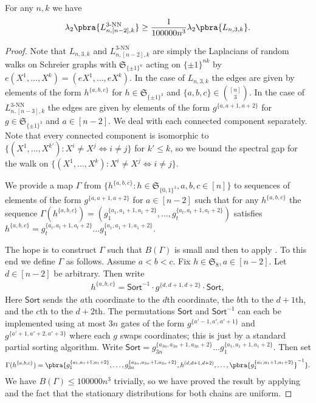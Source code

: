 \begin{lemma}\label{lem:initial spectral gap local random gates large k}
    For any $n,k$ we have
    \begin{align*}
        \lambda_2\pbra{L_{n,[n-2],k}^{3\text{-NN}}}\geq \frac1{100000n^3}\lambda_2\pbra{L_{n,3,k}}.
    \end{align*}
\end{lemma}
\begin{proof}
    Note that $L_{n,3,k}$ and $L_{n,[n-2],k}^{3\text{-NN}}$ are simply the Laplacians of random walks on Schreier graphs with $\mathfrak{S}_{\{\pm1\}^{n}}$ acting on $\{\pm1\}^{nk}$ by $e(X^1,\dots,X^k)=(eX^1,\dots,eX^k)$. In the case of $L_{n,3,k}$ the edges are given by elements of the form $h^{\{a,b,c\}}$ for $h\in\mathfrak{S}_{\{\pm1\}^3}$ and $\{a,b,c\}\in\binom{[n]}{3}$. In the case of $L_{n,[n-3],k}^{3\text{-NN}}$ the edges are given by elements of the form $g^{\{a,a+1,a+2\}}$ for $g\in\mathfrak{S}_{\{\pm1\}^3}$ and $a\in[n-2]$. We deal with each connected component separately. Note that every connected component is isomorphic to $\{(X^1,\dots,X^{k'}):X^i\neq X^j\iff i\neq j\}$ for $k'\leq k$, so we bound the spectral gap for the walk on $\{(X^1,\dots,X^{k}):X^i\neq X^j\iff i\neq j\}$.

    We provide a map $\Gamma$ from $\{h^{\{a,b,c\}}:h\in\mathfrak{S}_{\{0,1\}^3},a,b,c\in[n]\}$ to sequences of elements of the form $g^{\{a,a+1,a+2\}}$ for $a\in[n-2]$ such that for any $h^{\{a,b,c\}}$ the sequence $\Gamma(h^{\{a,b,c\}})=(g_1^{\{a_1,a_1+1,a_1+2\}},\dots ,g_t^{\{a_t,a_t+1,a_t+2\}})$ satisfies $h^{\{a,b,c\}}=g_t^{\{a_t,a_t+1,a_t+2\}}\dots g_1^{\{a_1,a_1+1,a_1+2\}}$.

    The hope is to construct $\Gamma$ such that $B(\Gamma)$ is small and then to apply . To this end we define $\Gamma$ as follows. Assume $a<b<c$. Fix $h\in\mathfrak{S}_8,a\in[n-2]$. Let $d\in[n-2]$ be arbitrary. Then write
    \begin{align*}
        h^{\{a,b,c\}}=\mathsf{Sort}^{-1} \cdot g^{\{d,d+1,d+2\}}\cdot\mathsf{Sort},
    \end{align*}
    Here $\mathsf{Sort}$ sends the $a$th coordinate to the $d$th coordinate, the $b$th to the $d+1$th, and the $c$th to the $d+2$th. The permutations $\mathsf{Sort}$ and $\mathsf{Sort}^{-1}$ can each be implemented using at most $3n$ gates of the form $g^{\{a'-1,a',a'+1\}}$ and $g^{\{a'+1,a'+2,a'+3\}}$ where each $g$ swaps coordinates; this is just by a standard partial sorting algorithm. Write $\mathsf{Sort}=g_{3n}^{\{a_{3n},a_{3n}+1,a_{3n}+2\}}\dots g_1^{\{a_1,a_1+1,a_1+2\}}$. Then set 
    \begin{align*}
        \Gamma(h^{\{a,b,c\}})=\pbra{g_1^{\{a_1,a_1+1,a_1+2\}},\dots,g_{3n}^{\{a_{3n},a_{3n}+1,a_{3n}+2\}},h^{(d,d+1,d+2)},\dots,\pbra{g_1^{\{a_1,a_1+1,a_1+2\}}}^{-1}}.
    \end{align*}
    We have $B(\Gamma)\leq 100000n^3$ trivially, so we have proved the result by applying  and the fact that the stationary distributions for both chains are uniform.
\end{proof}


